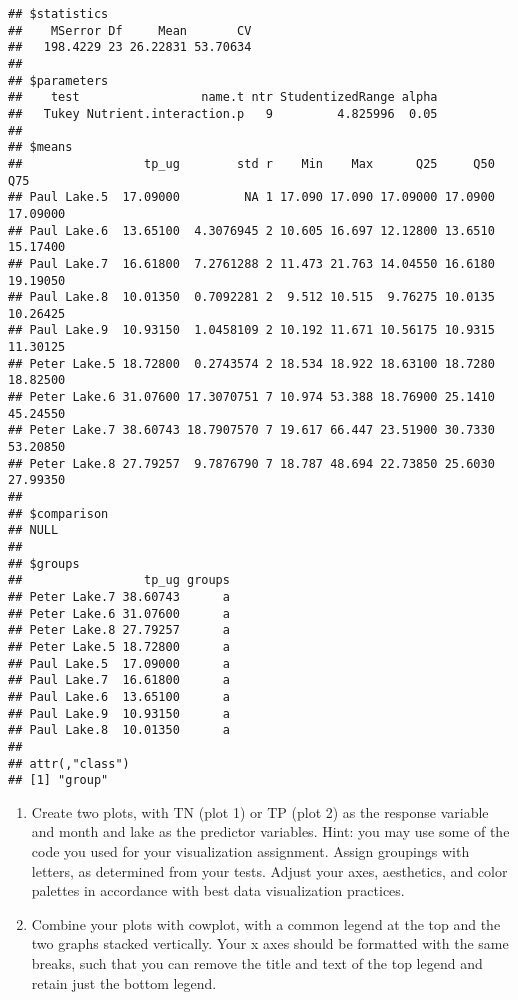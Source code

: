 \documentclass[]{article}
\begin{document}
\begin{verbatim}
## $statistics
##    MSerror Df     Mean       CV
##   198.4229 23 26.22831 53.70634
## 
## $parameters
##    test                 name.t ntr StudentizedRange alpha
##   Tukey Nutrient.interaction.p   9         4.825996  0.05
## 
## $means
##                 tp_ug        std r    Min    Max      Q25     Q50      Q75
## Paul Lake.5  17.09000         NA 1 17.090 17.090 17.09000 17.0900 17.09000
## Paul Lake.6  13.65100  4.3076945 2 10.605 16.697 12.12800 13.6510 15.17400
## Paul Lake.7  16.61800  7.2761288 2 11.473 21.763 14.04550 16.6180 19.19050
## Paul Lake.8  10.01350  0.7092281 2  9.512 10.515  9.76275 10.0135 10.26425
## Paul Lake.9  10.93150  1.0458109 2 10.192 11.671 10.56175 10.9315 11.30125
## Peter Lake.5 18.72800  0.2743574 2 18.534 18.922 18.63100 18.7280 18.82500
## Peter Lake.6 31.07600 17.3070751 7 10.974 53.388 18.76900 25.1410 45.24550
## Peter Lake.7 38.60743 18.7907570 7 19.617 66.447 23.51900 30.7330 53.20850
## Peter Lake.8 27.79257  9.7876790 7 18.787 48.694 22.73850 25.6030 27.99350
## 
## $comparison
## NULL
## 
## $groups
##                 tp_ug groups
## Peter Lake.7 38.60743      a
## Peter Lake.6 31.07600      a
## Peter Lake.8 27.79257      a
## Peter Lake.5 18.72800      a
## Paul Lake.5  17.09000      a
## Paul Lake.7  16.61800      a
## Paul Lake.6  13.65100      a
## Paul Lake.9  10.93150      a
## Paul Lake.8  10.01350      a
## 
## attr(,"class")
## [1] "group"
\end{verbatim}

\begin{enumerate}
\def\labelenumi{\arabic{enumi}.}
\setcounter{enumi}{6}
\item
  Create two plots, with TN (plot 1) or TP (plot 2) as the response
  variable and month and lake as the predictor variables. Hint: you may
  use some of the code you used for your visualization assignment.
  Assign groupings with letters, as determined from your tests. Adjust
  your axes, aesthetics, and color palettes in accordance with best data
  visualization practices.
\item
  Combine your plots with cowplot, with a common legend at the top and
  the two graphs stacked vertically. Your x axes should be formatted
  with the same breaks, such that you can remove the title and text of
  the top legend and retain just the bottom legend.
\end{enumerate}
\end{document}
